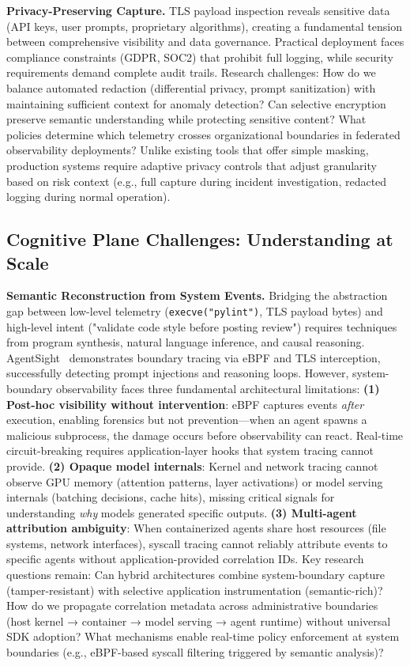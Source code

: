 \documentclass[sigplan,screen,9pt]{acmart}
\begin{document}
\textbf{Privacy-Preserving Capture.} TLS payload inspection reveals sensitive data (API keys, user prompts, proprietary algorithms), creating a fundamental tension between comprehensive visibility and data governance. Practical deployment faces compliance constraints (GDPR, SOC2) that prohibit full logging, while security requirements demand complete audit trails. Research challenges: How do we balance automated redaction (differential privacy, prompt sanitization) with maintaining sufficient context for anomaly detection? Can selective encryption preserve semantic understanding while protecting sensitive content? What policies determine which telemetry crosses organizational boundaries in federated observability deployments? Unlike existing tools that offer simple masking, production systems require adaptive privacy controls that adjust granularity based on risk context (e.g., full capture during incident investigation, redacted logging during normal operation).

\subsection{Cognitive Plane Challenges: Understanding at Scale}

\textbf{Semantic Reconstruction from System Events.} Bridging the abstraction gap between low-level telemetry (\texttt{execve("pylint")}, TLS payload bytes) and high-level intent ("validate code style before posting review") requires techniques from program synthesis, natural language inference, and causal reasoning. AgentSight~\cite{zheng2025agentsight} demonstrates boundary tracing via eBPF and TLS interception, successfully detecting prompt injections and reasoning loops. However, system-boundary observability faces three fundamental architectural limitations: \textbf{(1) Post-hoc visibility without intervention}: eBPF captures events \emph{after} execution, enabling forensics but not prevention—when an agent spawns a malicious subprocess, the damage occurs before observability can react. Real-time circuit-breaking requires application-layer hooks that system tracing cannot provide. \textbf{(2) Opaque model internals}: Kernel and network tracing cannot observe GPU memory (attention patterns, layer activations) or model serving internals (batching decisions, cache hits), missing critical signals for understanding \emph{why} models generated specific outputs. \textbf{(3) Multi-agent attribution ambiguity}: When containerized agents share host resources (file systems, network interfaces), syscall tracing cannot reliably attribute events to specific agents without application-provided correlation IDs. Key research questions remain: Can hybrid architectures combine system-boundary capture (tamper-resistant) with selective application instrumentation (semantic-rich)? How do we propagate correlation metadata across administrative boundaries (host kernel → container → model serving → agent runtime) without universal SDK adoption? What mechanisms enable real-time policy enforcement at system boundaries (e.g., eBPF-based syscall filtering triggered by semantic analysis)?
\end{document}
